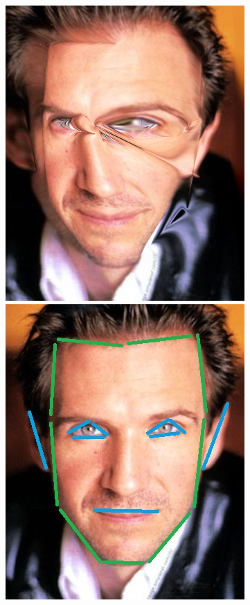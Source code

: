 \documentclass[conference]{IEEEtran}
\begin{document}
\begin{figure}[H]
\begin{multicols}{3}
    \centering
    \includegraphics[width=0.65\linewidth]{errors/01/img01.png} \par
    \includegraphics[width=0.65\linewidth]{errors/01/1 lines.jpg} \par

\end{multicols}
\end{figure}
\end{document}
